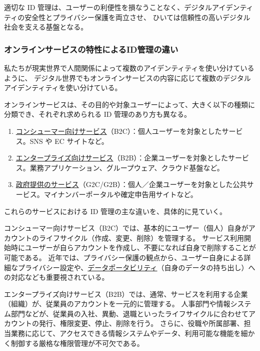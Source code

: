\documentclass[uplatex]{jsarticle}
\def\label#1{}%
\begin{document}
\begin{rem}\label{rem:ch1-identity-management-value}
適切な ID 管理は、ユーザーの利便性を損なうことなく、デジタルアイデンティティの安全性とプライバシー保護を両立させ、
ひいては信頼性の高いデジタル社会を支える基盤となる。
\end{rem}

\subsubsection{オンラインサービスの特性によるID管理の違い}

私たちが現実世界で人間関係によって複数のアイデンティティを使い分けているように、
デジタル世界でもオンラインサービスの内容に応じて複数のデジタルアイデンティティを使い分けている。

\begin{dfn}[オンラインサービスの種類]\label{dfn:ch1-service-types}
オンラインサービスは、その目的や対象ユーザーによって、大きく以下の種類に分類でき、それぞれ求められる ID 管理のあり方も異なる。
\begin{enumerate}
\item \underline{コンシューマー向けサービス}（B2C）：個人ユーザーを対象としたサービス。SNS や EC サイトなど。
\item \underline{エンタープライズ向けサービス}（B2B）：企業ユーザーを対象としたサービス。業務アプリケーション、グループウェア、クラウド基盤など。
\item \underline{政府提供のサービス}（G2C/G2B）：個人／企業ユーザーを対象とした公共サービス。マイナンバーポータルや確定申告用サイトなど。
\end{enumerate}
\end{dfn}

これらのサービスにおける ID 管理の主な違いを、具体的に見ていく。

\begin{exa}[コンシューマー向けサービス（B2C）の ID 管理]\label{exa:ch1-b2c}
コンシューマー向けサービス（B2C）では、基本的にユーザー（個人）自身がアカウントのライフサイクル（作成、変更、削除）を管理する。
サービス利用開始時にユーザーが自らアカウントを作成し、不要になれば自身で削除することが可能である。
近年では、プライバシー保護の観点から、ユーザー自身による詳細なプライバシー設定や、\underline{データポータビリティ}（自身のデータの持ち出し）への対応なども重要視されている。
\end{exa}

\begin{exa}[エンタープライズ向けサービス（B2B）の ID 管理]\label{exa:ch1-b2b}
エンタープライズ向けサービス（B2B）では、通常、サービスを利用する企業（組織）が、従業員のアカウントを一元的に管理する。
人事部門や情報システム部門などが、従業員の入社、異動、退職といったライフサイクルに合わせてアカウントの発行、権限変更、停止、削除を行う。
さらに、役職や所属部署、担当業務に応じて、アクセスできる情報システムやデータ、利用可能な機能を細かく制御する厳格な権限管理が不可欠である。
\end{exa}
\end{document}
